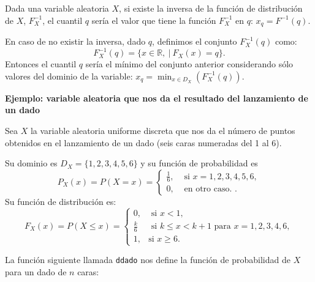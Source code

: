 \documentclass[]{book}
\newenvironment{Shaded}{\begin{snugshade}}{\end{snugshade}}
\newcommand{\ControlFlowTok}[1]{\textcolor[rgb]{0.13,0.29,0.53}{\textbf{#1}}}
\newcommand{\DataTypeTok}[1]{\textcolor[rgb]{0.13,0.29,0.53}{#1}}
\newcommand{\DecValTok}[1]{\textcolor[rgb]{0.00,0.00,0.81}{#1}}
\newcommand{\KeywordTok}[1]{\textcolor[rgb]{0.13,0.29,0.53}{\textbf{#1}}}
\newcommand{\NormalTok}[1]{#1}
\newcommand{\OperatorTok}[1]{\textcolor[rgb]{0.81,0.36,0.00}{\textbf{#1}}}
\newcommand{\StringTok}[1]{\textcolor[rgb]{0.31,0.60,0.02}{#1}}
\begin{document}
Dada una variable aleatoria \(X\), si existe la inversa de la función de distribución de \(X\), \(F_X^{-1}\), el cuantil \(q\) sería el valor que tiene la función \(F_X^{-1}\) en \(q\): \(x_q=F^{-1}(q)\).

En caso de no existir la inversa, dado \(q\), definimos el conjunto \(F_X^{-1}(q)\) como:
\[
F_X^{-1}(q) =\{x\in\mathbb{R},\ |\ F_X(x)=q\}.
\]
Entonces el cuantil \(q\) sería el mínimo del conjunto anterior considerando sólo valores del dominio de la variable: \(x_q =\min_{x\in D_X}(F_X^{-1}(q))\).

\textbf{Ejemplo: variable aleatoria que nos da el resultado del lanzamiento de un dado}

Sea \(X\) la variable aleatoria uniforme discreta que nos da el número de puntos obtenidos en el lanzamiento de un dado (seis caras numeradas del 1 al 6).

Su dominio es \(D_X=\{1,2,3,4,5,6\}\) y su función de probabilidad es
\[
P_X(x)=P(X=x)=
\left\{
\begin{array}{ll}
 \frac{1}{6}, & \mbox{ si } x=1,2,3,4,5,6, \\
0, & \mbox{ en otro caso. }.
\end{array}
\right.
\]
Su función de distribución es:
\[
F_X(x)= P(X\leq x)=
\left\{
\begin{array}{ll}
0, & \mbox{ si } x<1, \\
\frac{k}{6} & \mbox{ si } k\leq x< k+1 \mbox{ para } x= 1,2,3,4,6, \\
 1, & \mbox{si  } x \geq 6.
\end{array}
\right.
\]

La función siguiente llamada \texttt{ddado} nos define la función de probabilidad de \(X\) para un dado de \(n\) caras:

\begin{Shaded}
\end{Shaded}
\end{document}
